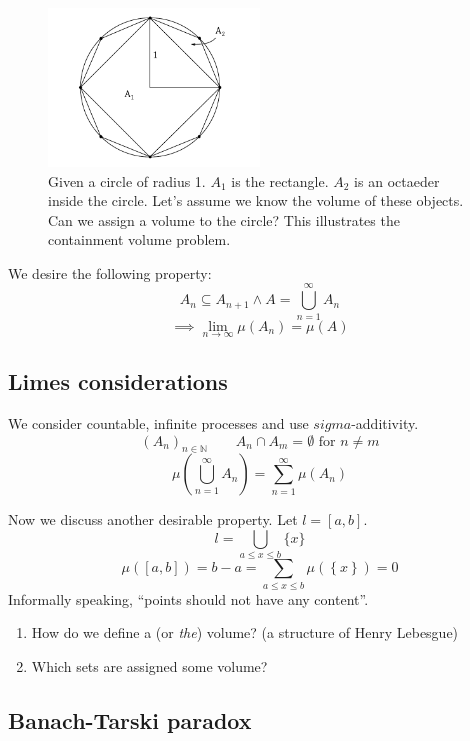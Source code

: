 \documentclass{article}
\newcommand{\set}[1]{\left\{#1\right\}}
\begin{document}
\begin{figure}[!h]
  \begin{center}
    \includegraphics[width=0.5\textwidth]{img/12_area.pdf}
    \caption{
      Given a circle of radius 1.
      $A_1$ is the rectangle. $A_2$ is an octaeder inside the circle.
      Let's assume we know the volume of these objects.
      Can we assign a volume to the circle?
      This illustrates the containment volume problem.
    }
  \end{center}
\end{figure}

We desire the following property:
\[ A_n \subseteq A_{n+1} \land A = \bigcup_{n=1}^\infty A_n \]
\[ \implies \lim_{n\to\infty} \mu(A_n) = \mu(A) \]

\subsection{Limes considerations}

We consider countable, infinite processes
and use $sigma$-additivity.
\[ \left(A_n\right)_{n \in \mathbb N} \qquad A_n \cap A_m = \emptyset \text{ for } n \neq m \]
\[ \mu\left(\bigcup_{n=1}^\infty A_n\right) = \sum_{n=1}^\infty \mu(A_n) \]

Now we discuss another desirable property. Let $l = [a,b]$.
\[ l = \bigcup_{a \leq x \leq b} \{x\} \]
\[ \mu([a,b]) = b - a = \sum_{a \leq x \leq b} \mu(\set{x}) = 0 \]
Informally speaking, \enquote{points should not have any content}.

\begin{enumerate}
  \item How do we define a (or \emph{the}) volume?
        (a structure of Henry Lebesgue)
  \item Which sets are assigned some volume?
\end{enumerate}

\subsection{Banach-Tarski paradox}
\end{document}
